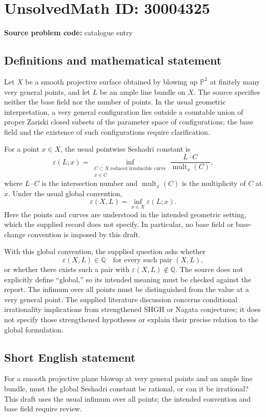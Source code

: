 \documentclass[11pt]{article}
\newcommand{\Q}{\mathbb{Q}}
\newcommand{\PP}{\mathbb{P}}
\begin{document}
\section*{UnsolvedMath ID: 30004325}
\textbf{Source problem code:} catalogue entry
\subsection{Definitions and mathematical statement}
Let \(X\) be a smooth projective surface obtained by blowing up \(\PP^2\) at finitely many very general points, and let \(L\) be an ample line bundle on \(X\). The source specifies neither the base field nor the number of points. In the usual geometric interpretation, a very general configuration lies outside a countable union of proper Zariski closed subsets of the parameter space of configurations; the base field and the existence of such configurations require clarification.

For a point \(x\in X\), the usual pointwise Seshadri constant is
\[
\varepsilon(L;x)=\inf_{\substack{C\subset X\text{ reduced irreducible curve}\\x\in C}}\frac{L\cdot C}{\operatorname{mult}_x(C)},
\]
where \(L\cdot C\) is the intersection number and \(\operatorname{mult}_x(C)\) is the multiplicity of \(C\) at \(x\). Under the usual global convention,
\[
\varepsilon(X,L)=\inf_{x\in X}\varepsilon(L;x).
\]
Here the points and curves are understood in the intended geometric setting, which the supplied record does not specify. In particular, no base field or base-change convention is imposed by this draft.

With this global convention, the supplied question asks whether
\[
\varepsilon(X,L)\in\Q
\quad\text{for every such pair }(X,L),
\]
or whether there exists such a pair with \(\varepsilon(X,L)\notin\Q\). The source does not explicitly define ``global,'' so its intended meaning must be checked against the report. The infimum over all points must be distinguished from the value at a very general point. The supplied literature discussion concerns conditional irrationality implications from strengthened SHGH or Nagata conjectures; it does not specify those strengthened hypotheses or explain their precise relation to the global formulation.
\subsection{Short English statement}
For a smooth projective plane blowup at very general points and an ample line bundle, must the global Seshadri constant be rational, or can it be irrational? This draft uses the usual infimum over all points; the intended convention and base field require review.
\end{document}
